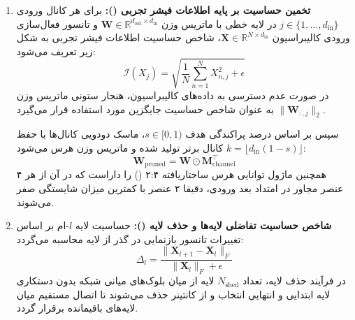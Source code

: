 \begin{enumerate}
    \item \textbf{تخمین حساسیت بر پایه اطلاعات فیشر تجربی ():} برای هر کانال ورودی $j \in \{1, \dots, d_{\text{in}}\}$ در لایه خطی با ماتریس وزن $\mathbf{W} \in \mathbb{R}^{d_{\text{out}} \times d_{\text{in}}}$ و تانسور فعال‌سازی ورودی کالیبراسیون $\mathbf{X} \in \mathbb{R}^{N \times d_{\text{in}}}$، شاخص حساسیت اطلاعات فیشر تجربی به شکل زیر تعریف می‌شود:
    \begin{equation}
    \mathcal{I}(X_j) = \sqrt{\frac{1}{N} \sum_{n=1}^N X_{n, j}^2 + \epsilon}
    \end{equation}
    در صورت عدم دسترسی به داده‌های کالیبراسیون، هنجار ستونی ماتریس وزن $\|\mathbf{W}_{:, j}\|_2$ به عنوان شاخص حساسیت جایگزین مورد استفاده قرار می‌گیرد.
    
    سپس بر اساس درصد پراکندگی هدف $s \in [0, 1)$، ماسک دودویی کانال‌ها با حفظ $k = \lfloor d_{\text{in}}(1 - s) \rfloor$ کانال برتر تولید شده و ماتریس وزن هرس می‌شود:
    \begin{equation}
    \mathbf{W}_{\text{pruned}} = \mathbf{W} \odot \mathbf{M}_{\text{channel}}^\top
    \end{equation}
    همچنین ماژول توانایی هرس ساختاریافته ۲:۴ () را داراست که در آن از هر ۴ عنصر مجاور در امتداد بعد ورودی، دقیقا ۲ عنصر با کمترین میزان شایستگی صفر می‌شوند.

    \item \textbf{شاخص حساسیت تفاضلی لایه‌ها و حذف لایه ():} حساسیت لایه $l$-ام بر اساس تغییرات تانسور بازنمایی در گذر از لایه محاسبه می‌گردد:
    \begin{equation}
    \Delta_l = \frac{\|\mathbf{X}_{l+1} - \mathbf{X}_l\|_F}{\|\mathbf{X}_l\|_F + \epsilon}
    \end{equation}
    در فرآیند حذف لایه، تعداد $N_{\text{shed}}$ لایه از میان بلوک‌های میانی شبکه بدون دستکاری لایه ابتدایی و انتهایی انتخاب و از کانتینر  حذف می‌شوند تا اتصال مستقیم میان لایه‌های باقیمانده برقرار گردد.
\end{enumerate}

